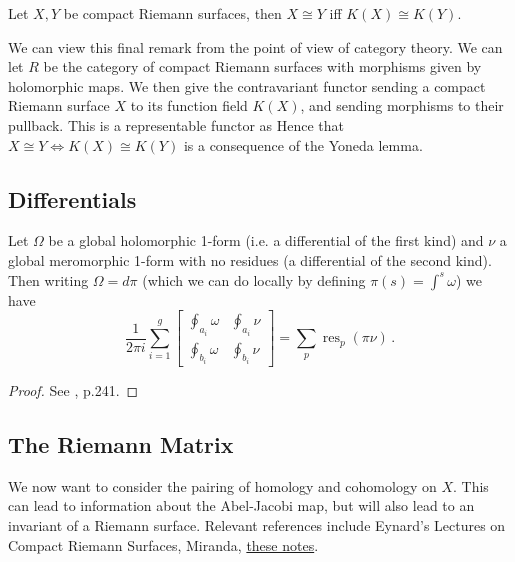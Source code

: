 \documentclass{article}
\begin{document}
\begin{corollary}
	Let $X,Y$ be compact Riemann surfaces, then $X\cong Y$ iff $K(X) \cong K(Y)$. 
\end{corollary}

\begin{remark}
	We can view this final remark from the point of view of category theory. We can let $R$ be the category of compact Riemann surfaces with morphisms given by holomorphic maps. We then give the contravariant functor 
	sending a compact Riemann surface $X$ to its function field $K(X)$, and sending morphisms to their pullback. This is a representable functor as 
	Hence that $X \cong Y \Leftrightarrow K(X) \cong K(Y)$ is a consequence of the Yoneda lemma. 
\end{remark}

\subsection{Differentials}

\begin{prop}
	Let $\Omega$ be a global holomorphic 1-form (i.e. a differential of the first kind) and $\nu$ a global meromorphic 1-form with no residues (a differential of the second kind). Then writing $\Omega = d \pi$ (which we can do locally by defining $\pi(s) = \int^s \omega$) we have 
	\[
	\frac{1}{2\pi i} \sum_{i=1}^g \begin{bmatrix} \oint_{a_i} \omega & \oint_{a_i} \nu \\ \oint_{b_i} \omega & \oint_{b_i} \nu \end{bmatrix} = \sum_p \operatorname{res}_p( \pi \nu) \, .
	\]
\end{prop}
\begin{proof}
	See \cite{Griffiths1985}, p.241.
\end{proof}

\subsection{The Riemann Matrix}
We now want to consider the pairing of homology and cohomology on $X$. This can lead to information about the Abel-Jacobi map, but will also lead to an invariant of a Riemann surface. Relevant references include Eynard's Lectures on Compact Riemann Surfaces, Miranda, \href{https://people.reed.edu/~jerry/311/theta.pdf}{these notes}. 
\end{document}
